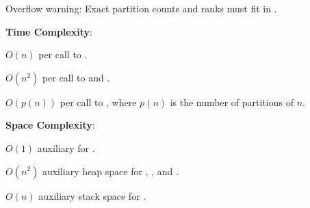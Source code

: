 Overflow warning: Exact partition counts and ranks must fit in .

\textbf{Time Complexity}:
\begin{compactitem}
  \item $O(n)$ per call to .
  \item $O(n^{2})$ per call to  and .
  \item $O(p(n))$ per call to , where $p(n)$ is the number of partitions of $n$.
\end{compactitem}

\textbf{Space Complexity}:
\begin{compactitem}
  \item $O(1)$ auxiliary for .
  \item $O(n^{2})$ auxiliary heap space for , , and .
  \item $O(n)$ auxiliary stack space for .
\end{compactitem}

